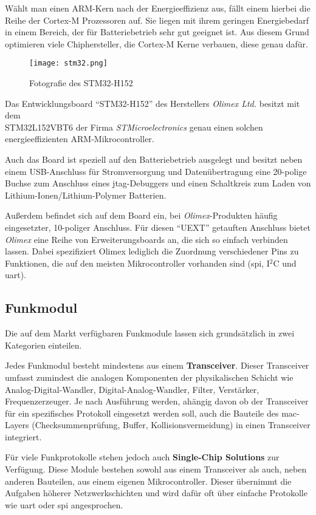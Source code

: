 Wählt man einen ARM-Kern nach der Energieeffizienz aus, fällt einem hierbei die
Reihe der Cortex-M Prozessoren auf. Sie liegen mit ihrem geringen Energiebedarf
in einem Bereich, der für Batteriebetrieb sehr gut geeignet ist. Aus diesem
Grund optimieren viele Chiphersteller, die Cortex-M Kerne verbauen, diese genau
dafür.

\begin{figure}[!ht]
\centering
\texttt{[image: stm32.png]}\\
\caption{Fotografie des STM32-H152}{}
\end{figure}

Das Entwicklungsboard "`STM32-H152"'\cite{OLI2} des Herstellers
\emph{Olimex Ltd.} besitzt mit dem \\STM32L152VBT6 der Firma
\emph{STMicroelectronics} genau einen solchen
energieeffizienten ARM-Mikrocontroller.

Auch das Board ist speziell auf den Batteriebetrieb ausgelegt und besitzt neben
einem USB-Anschluss für Stromversorgung und Datenübertragung eine 20-polige Buchse zum
Anschluss eines \gls{jtag}-Debuggers und einen Schaltkreis zum Laden von
Lithium-Ionen/Lithium-Polymer Batterien.

Außerdem befindet sich auf dem Board ein, bei \emph{Olimex}-Produkten häufig
eingesetzter, 10-poliger Anschluss. Für diesen "`UEXT"' getauften Anschluss
bietet \emph{Olimex} eine Reihe von Erweiterungsboards an, die sich so einfach
verbinden lassen. Dabei spezifiziert Olimex lediglich die Zuordnung
verschiedener Pins zu Funktionen, die auf den meisten Mikrocontroller
vorhanden sind (\gls{spi}, I$^2$C und \gls{uart}).

\subsection{Funkmodul} Die auf dem Markt verfügbaren Funkmodule lassen
sich grundsätzlich in zwei Kategorien einteilen.

Jedes Funkmodul besteht mindestens aus einem \textbf{Transceiver}. Dieser
Transceiver umfasst zumindest die analogen Komponenten der physikalischen
Schicht wie Analog-Digital-Wandler, Digital-Analog-Wandler, Filter, Verstärker,
Frequenzerzeuger. Je nach Ausführung werden, ahängig davon ob der Transceiver
für ein spezifisches Protokoll eingesetzt werden soll, auch die Bauteile des
\gls{mac}-Layers (Checksummenprüfung, Buffer, Kollisionsvermeidung) in
einen Transceiver integriert.

Für viele Funkprotokolle stehen jedoch auch \textbf{Single-Chip Solutions}
zur Verfügung. Diese Module bestehen sowohl aus einem Transceiver als auch,
neben anderen Bauteilen, aus einem eigenen Mikrocontroller. Dieser übernimmt die
Aufgaben höherer Netzwerkschichten und wird dafür oft über einfache Protokolle
wie \gls{uart} oder \gls{spi} angesprochen.

